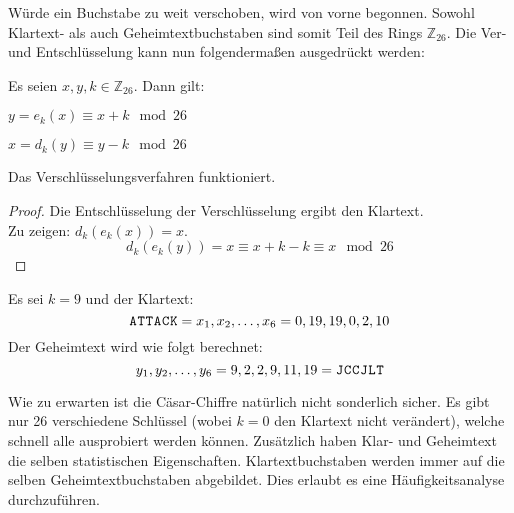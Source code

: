 \noindent
Würde ein Buchstabe zu weit verschoben, wird von vorne begonnen.
Sowohl Klartext- als auch Geheimtextbuchstaben sind somit Teil des Rings $\mathbb{Z}_{26}$.
Die Ver- und Entschlüsselung kann nun folgendermaßen ausgedrückt werden:

\begin{definition}
  Es seien $x,y,k \in \mathbb{Z}_{26}$. Dann gilt:
  \begin{description}[itemsep = 0pt]
    \item[Verschlüsselung:] $y = e_k(x) \equiv x + k \mod{26}$
    \item[Entschlüsselung:] $x = d_k(y) \equiv y - k \mod{26}$
  \end{description}
\end{definition}

Das Verschlüsselungsverfahren funktioniert.
\begin{proof}
  Die Entschlüsselung der Verschlüsselung ergibt den Klartext. \\
  Zu zeigen: $d_k(e_k(x)) = x$.
  \begin{equation*}
    d_k(e_k(y)) = x \equiv x + k - k \equiv x \mod{26}
  \end{equation*}
\end{proof}
\begin{example}
  Es sei $k = 9$ und der Klartext:
  \begin{equation*}
    \text{\texttt{A\kern 0.2mmT\kern 0.2mmT\kern 0.2mmA\kern 0.2mmC\kern 0.2mmK}}
    = x_1,x_2,\dots,x_6 = 0,19,19,0,2,10
  \end{equation*}
  Der Geheimtext wird wie folgt berechnet:
  \begin{equation*}
    y_1,y_2,\dots,y_6 = 9,2,2,9,11,19 =
    \text{\texttt{J\kern 0.2mmC\kern 0.2mmC\kern 0.2mmJ\kern 0.2mmL\kern 0.2mmT}}
  \end{equation*}
\end{example}

\noindent
Wie zu erwarten ist die Cäsar-Chiffre natürlich nicht sonderlich sicher.
Es gibt nur 26 verschiedene Schlüssel (wobei $k = 0$ den Klartext nicht verändert),
welche schnell alle ausprobiert werden können. Zusätzlich
haben Klar- und Geheimtext die selben statistischen Eigenschaften.
Klartextbuchstaben werden immer auf die selben Geheimtextbuchstaben abgebildet. Dies
erlaubt es eine Häufigkeitsanalyse durchzuführen.